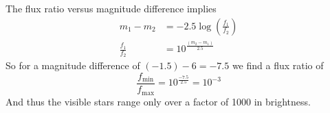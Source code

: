 The flux ratio versus magnitude difference implies
\begin{align*}
m_1 - m_2 &= -2.5 \log\!\left(\frac{f_1}{f_2}\right)\\
\frac{f_1}{f_2} &= 10^{\frac{(m_2 - m_1)}{2.5}}
\end{align*}
So for a magnitude difference of $(-1.5) - 6 = -7.5$ we find a flux ratio of
\[
\frac{f_{\min}}{f_{\max}} = 10^{\frac{-7.5}{2.5}} = 10^{-3}
\]
And thus the visible stars range only over a factor of 1000 in brightness.
